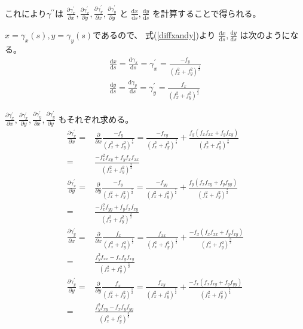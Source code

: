 \documentclass[12pt,b5paper]{ltjsarticle}
\begin{document}
\begin{enumerate}
      これにより$\gamma^{\prime\prime}$は
      $
      \frac{\partial \gamma_{x}^{\prime}}{\partial x},
      \frac{\partial \gamma_{x}^{\prime}}{\partial y},
      \frac{\partial \gamma_{y}^{\prime}}{\partial x},
      \frac{\partial \gamma_{y}^{\prime}}{\partial y}
      $
      と
      $\frac{\mathrm{d}x}{\mathrm{d}s},\frac{\mathrm{d}y}{\mathrm{d}s}$
      を計算することで得られる。

      $x=\gamma_{x}(s),y=\gamma_{y}(s)$であるので、
      式(\ref{diffxandy})より
      $\frac{\mathrm{d}x}{\mathrm{d}s},\frac{\mathrm{d}y}{\mathrm{d}s}$
      は次のようになる。
      \begin{align}
       \frac{\mathrm{d}x}{\mathrm{d}s}
       = \frac{\mathrm{d}\gamma_{x}}{\mathrm{d}s}
       = \gamma_{x}^{\prime}
       = \frac{-f_{y}}{(f_{x}^2+f_{y}^2)^\frac{1}{2}}\\
       \frac{\mathrm{d}y}{\mathrm{d}s}
       = \frac{\mathrm{d}\gamma_{y}}{\mathrm{d}s}
       = \gamma_{y}^{\prime}
       = \frac{f_{x}}{(f_{x}^2+f_{y}^2)^\frac{1}{2}}
      \end{align}

      
      $
      \frac{\partial \gamma_{x}^{\prime}}{\partial x},
      \frac{\partial \gamma_{x}^{\prime}}{\partial y},
      \frac{\partial \gamma_{y}^{\prime}}{\partial x},
      \frac{\partial \gamma_{y}^{\prime}}{\partial y}
      $
      もそれぞれ求める。
      \begin{align}
       \frac{\partial \gamma_{x}^{\prime}}{\partial x}
       =& \frac{\partial}{\partial x}
       \frac{-f_{y}}{(f_{x}^2+f_{y}^2)^\frac{1}{2}}
       = \frac{-f_{xy}}{(f_{x}^2+f_{y}^2)^\frac{1}{2}}
       + \frac{f_{y}(f_{x}f_{xx}+f_{y}f_{xy})}{(f_{x}^2+f_{y}^2)^\frac{3}{2}}\\
       =& \frac{-f_{x}^2f_{xy} + f_{y}f_{x}f_{xx}}{(f_{x}^2+f_{y}^2)^\frac{3}{2}}\\
%
       \frac{\partial \gamma_{x}^{\prime}}{\partial y}
       =& \frac{\partial}{\partial y}
       \frac{-f_{y}}{(f_{x}^2+f_{y}^2)^\frac{1}{2}}
       = \frac{-f_{yy}}{(f_{x}^2+f_{y}^2)^\frac{1}{2}}
       + \frac{f_{y}(f_{x}f_{xy}+f_{y}f_{yy})}{(f_{x}^2+f_{y}^2)^\frac{3}{2}}\\
       =& \frac{-f_{x}^2f_{yy} + f_{y}f_{x}f_{xy}}{(f_{x}^2+f_{y}^2)^\frac{3}{2}}\\
%
      \frac{\partial \gamma_{y}^{\prime}}{\partial x}
       =& \frac{\partial}{\partial x}
       \frac{f_{x}}{(f_{x}^2+f_{y}^2)^\frac{1}{2}}
       = \frac{f_{xx}}{(f_{x}^2+f_{y}^2)^\frac{1}{2}}
       + \frac{-f_{x}(f_{x}f_{xx}+f_{y}f_{xy})}{(f_{x}^2+f_{y}^2)^\frac{3}{2}}\\
       =& \frac{f_{y}^2 f_{xx}-f_{x}f_{y}f_{xy}}{(f_{x}^2+f_{y}^2)^\frac{3}{2}}\\
%
      \frac{\partial \gamma_{y}^{\prime}}{\partial y}
       =& \frac{\partial}{\partial y}
       \frac{f_{x}}{(f_{x}^2+f_{y}^2)^\frac{1}{2}}
       = \frac{f_{xy}}{(f_{x}^2+f_{y}^2)^\frac{1}{2}}
       + \frac{-f_{x}(f_{x}f_{xy}+f_{y}f_{yy})}{(f_{x}^2+f_{y}^2)^\frac{3}{2}}\\
       =& \frac{f_{y}^2 f_{xy}-f_{x}f_{y}f_{yy}}{(f_{x}^2+f_{y}^2)^\frac{3}{2}}
      \end{align}



\end{enumerate}
\end{document}
